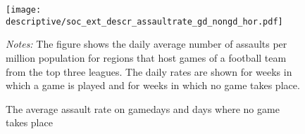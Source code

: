 \begin{figure}[t]\centering
	\texttt{[image: descriptive/soc\_ext\_descr\_assaultrate\_gd\_nongd\_hor.pdf]}
	\begin{minipage}{0.9\linewidth}
		\caption{The average assault rate on gamedays and days where no game takes place}\label{fig_soc_ext:assault_rate_across_dows}
		\scriptsize{\emph{Notes:} The figure shows the daily average number of assaults per million population for regions that host games of a football team from the top three leagues. The daily rates are shown for weeks in which a game is played and for weeks in which no game takes place.}
	\end{minipage}
\end{figure}